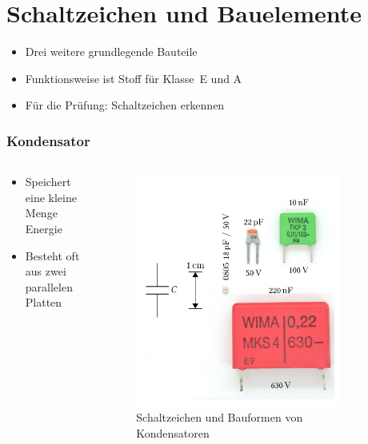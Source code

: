 
\section{Schaltzeichen und Bauelemente}
\label{section:bauelemente}
\begin{frame}%
\begin{itemize}
  \item Drei weitere grundlegende Bauteile
  \item Funktionsweise ist Stoff für Klasse~E und A
  \item Für die Prüfung: Schaltzeichen erkennen
  \end{itemize}
\end{frame}

\begin{frame}
\frametitle{Kondensator}
\begin{columns}
    \begin{column}{0.48\textwidth}
    \begin{itemize}
  \item Speichert eine kleine Menge Energie
  \item Besteht oft aus zwei parallelen Platten
  \end{itemize}

    \end{column}
   \begin{column}{0.48\textwidth}
       
\begin{figure}
    \includegraphics[width=0.85\textwidth]{foto/206}
    \caption{\scriptsize Schaltzeichen und Bauformen von Kondensatoren}
    \label{n_bauelemente_kondensator}
\end{figure}

   \end{column}
\end{columns}

\end{frame}

